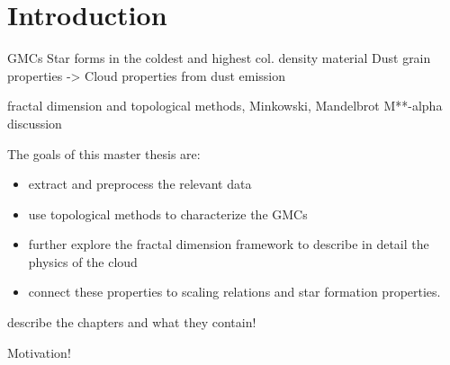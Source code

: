 \chapter{Introduction}

GMCs
Star forms in the coldest and highest col. density material
Dust grain properties -> Cloud properties from dust emission

fractal dimension and topological methods, Minkowski, Mandelbrot
M**-alpha discussion

The goals of this master thesis are:
\begin{itemize}
    \item extract and preprocess the relevant data
    \item use topological methods to characterize the GMCs
    \item further explore the fractal dimension framework to describe in detail the physics of the cloud
    \item connect these properties to scaling relations and star formation properties.
\end{itemize}

describe the chapters and what they contain!

Motivation!